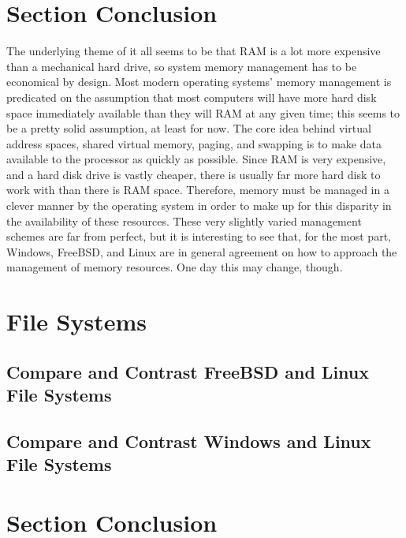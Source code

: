 \documentclass[onecolumn, draftclsnofoot,10pt, compsoc]{IEEEtran}
\begin{document}
\section{Section Conclusion}
\noindent The underlying theme of it all seems to be that RAM is a lot more expensive than a mechanical hard drive, so system memory management has to be economical by design. Most modern operating systems’ memory management is predicated on the assumption that most computers will have more hard disk space immediately available than they will RAM at any given time; this seems to be a pretty solid assumption, at least for now. The core idea behind virtual address spaces, shared virtual memory, paging, and swapping is to make data available to the processor as quickly as possible. Since RAM is very expensive, and a hard disk drive is vastly cheaper, there is usually far more hard disk to work with than there is RAM space. Therefore, memory must be managed in a clever manner by the operating system in order to make up for this disparity in the availability of these resources. These very slightly varied management schemes are far from perfect, but it is interesting to see that, for the most part, Windows, FreeBSD, and Linux are in general agreement on how to approach the management of memory resources. One day this may change, though.\\

\section{File Systems}

\subsection{Compare and Contrast FreeBSD and Linux File Systems}
\noindent

\subsection{Compare and Contrast Windows and Linux File Systems}
\noindent

\section{Section Conclusion}
\noindent

\newpage


\end{document}
